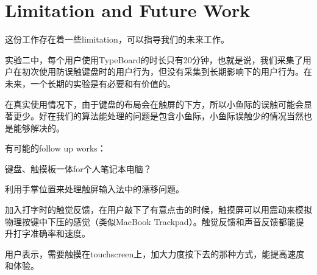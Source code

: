 \section{Limitation and Future Work}

这份工作存在着一些limitation，可以指导我们的未来工作。

实验二中，每个用户使用TypeBoard的时长只有20分钟，也就是说，我们采集了用户在初次使用防误触键盘时的用户行为，但没有采集到长期影响下的用户行为。在未来，一个长期的实验是有必要和有价值的。

在真实使用情况下，由于键盘的布局会在触屏的下方，所以小鱼际的误触可能会显著更少。好在我们的算法能处理的问题是包含小鱼际，小鱼际误触少的情况当然也是能够解决的。

有可能的follow up works：

键盘、触摸板一体for个人笔记本电脑？

利用手掌位置来处理触屏输入法中的漂移问题。

加入打字时的触觉反馈，在用户敲下了有意点击的时候，触摸屏可以用震动来模拟物理按键中下压的感觉（类似MacBook Trackpad）。触觉反馈和声音反馈都能提升打字准确率和速度\cite{2015-Haptic}。

用户表示，需要触摸在touchscreen上，加大力度按下去的那种方式，能提高速度和体验。
